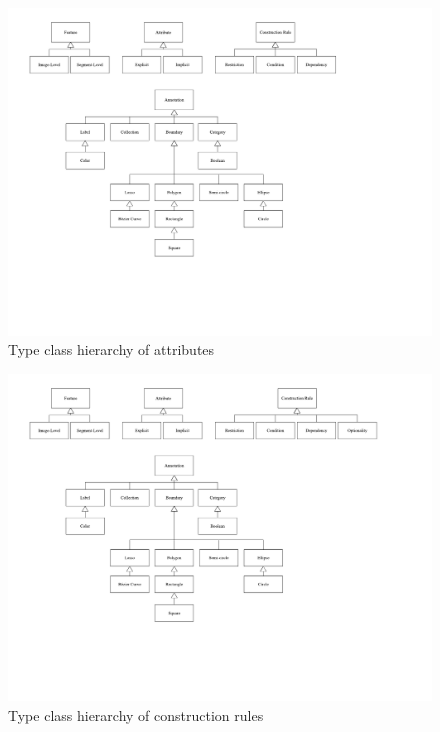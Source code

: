\begin{figure}[p]
  \centering
  \includegraphics{images/class_diagrams/attribute}
  \caption{Type class hierarchy of attributes}
  \label{fig:metamodel_class_diagrams:attributes}  
\end{figure}

\begin{figure}[p]
  \centering
  \includegraphics{images/class_diagrams/construction_rule}
  \caption{Type class hierarchy of construction rules}
  \label{fig:metamodel_class_diagrams:construction_rules}  
\end{figure}
